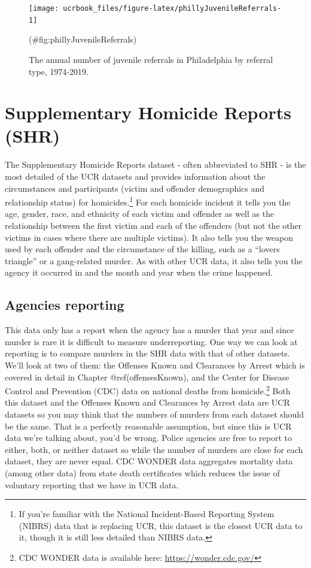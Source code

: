 \documentclass[
  12pt,
  openany]{book}
\begin{document}
\begin{figure}

{\centering \texttt{[image: ucrbook\_files/figure-latex/phillyJuvenileReferrals-1]} 

}

\caption{The annual number of juvenile referrals in Philadelphia by referral type, 1974-2019.}(\#fig:phillyJuvenileReferrals)
\end{figure}

\hypertarget{shr}{%
\chapter{Supplementary Homicide Reports (SHR)}\label{shr}}

The Supplementary Homicide Reports dataset - often abbreviated to SHR - is the most detailed of the UCR datasets and provides information about the circumstances and participants (victim and offender demographics and relationship status) for homicides.\footnote{If you're familiar with the National Incident-Based Reporting System (NIBRS) data that is replacing UCR, this dataset is the closest UCR data to it, though it is still less detailed than NIBRS data.} For each homicide incident it tells you the age, gender, race, and ethnicity of each victim and offender as well as the relationship between the first victim and each of the offenders (but not the other victims in cases where there are multiple victims). It also tells you the weapon used by each offender and the circumstance of the killing, such as a ``lovers triangle'' or a gang-related murder. As with other UCR data, it also tells you the agency it occurred in and the month and year when the crime happened.

\hypertarget{agencies-reporting-3}{%
\section{Agencies reporting}\label{agencies-reporting-3}}

This data only has a report when the agency has a murder that year and since murder is rare it is difficult to measure underreporting. One way we can look at reporting is to compare murders in the SHR data with that of other datasets. We'll look at two of them: the Offenses Known and Clearances by Arrest which is covered in detail in Chapter @ref(offensesKnown), and the Center for Disease Control and Prevention (CDC) data on national deaths from homicide.\footnote{CDC WONDER data is available here: \url{https://wonder.cdc.gov/}} Both this dataset and the Offenses Known and Clearances by Arrest data are UCR datasets so you may think that the numbers of murders from each dataset should be the same. That is a perfectly reasonable assumption, but since this is UCR data we're talking about, you'd be wrong. Police agencies are free to report to either, both, or neither dataset so while the number of murders are close for each dataset, they are never equal. CDC WONDER data aggregates mortality data (among other data) from state death certificates which reduces the issue of voluntary reporting that we have in UCR data.
\end{document}
